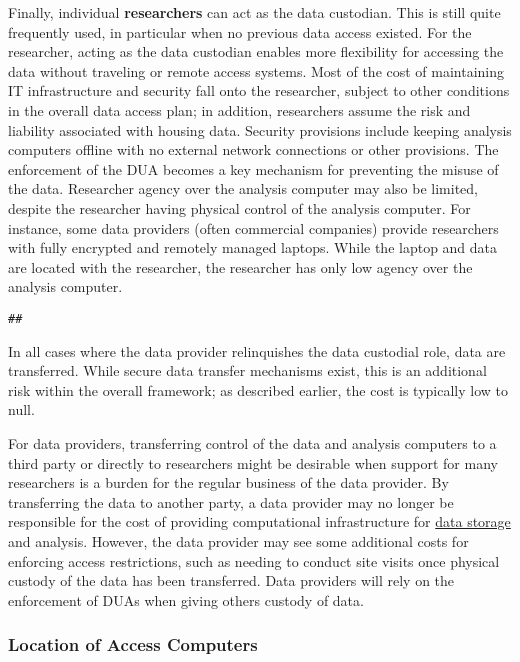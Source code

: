 Finally, individual \textbf{researchers} can act as the data custodian. This is still quite frequently used, in particular when no previous data access existed. For the researcher, acting as the data custodian enables more flexibility for accessing the data without traveling or remote access systems. Most of the cost of maintaining IT infrastructure and security fall onto the researcher, subject to other conditions in the overall data access plan; in addition, researchers assume the risk and liability associated with housing data. Security provisions include keeping analysis computers offline with no external network connections or other provisions. The enforcement of the DUA becomes a key mechanism for preventing the misuse of the data. Researcher agency over the analysis computer may also be limited, despite the researcher having physical control of the analysis computer. For instance, some data providers (often commercial companies) provide researchers with fully encrypted and remotely managed laptops. While the laptop and data are located with the researcher, the researcher has only low agency over the analysis computer.

\begin{verbatim}
## 
\end{verbatim}

In all cases where the data provider relinquishes the data custodial role, data are transferred. While secure data transfer mechanisms exist, this is an additional risk within the overall framework; as described earlier, the cost is typically low to null.

For data providers, transferring control of the data and analysis computers to a third party or directly to researchers might be desirable when support for many researchers is a burden for the regular business of the data provider. By transferring the data to another party, a data provider may no longer be responsible for the cost of providing computational infrastructure for \protect\hyperlink{storage-of-data}{data storage} and analysis. However, the data provider may see some additional costs for enforcing access restrictions, such as needing to conduct site visits once physical custody of the data has been transferred. Data providers will rely on the enforcement of DUAs when giving others custody of data.

\hypertarget{location-of-access-computers}{%
\subsubsection{Location of Access Computers}\label{location-of-access-computers}}

